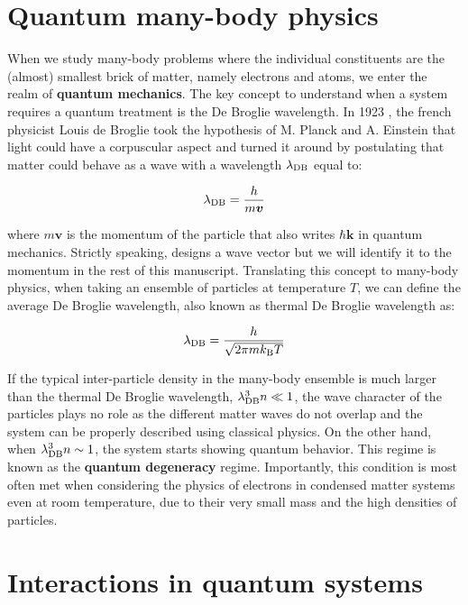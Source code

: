 \section*{Quantum many-body physics}

When we study many-body problems where the individual constituents are the (almost) smallest brick of matter, namely electrons and atoms, we enter the realm of \textbf{quantum mechanics}. The key concept to understand when a system requires a quantum treatment is the De Broglie wavelength. In 1923 \cite{debroglie:tel-00006807}, the french physicist Louis de Broglie took the hypothesis of M. Planck and A. Einstein that light could have a corpuscular aspect and turned it around by postulating that matter could behave as a wave with a wavelength $\lambda_{\rm{DB}}$ equal to:

\begin{equation}
    \lambda_{\rm{DB}} = \frac{h}{m\bm{v}}
\end{equation}

\noindent where $m\bm{v}$ is the momentum of the particle that also writes $\hbar \bm{k}$ in quantum mechanics. Strictly speaking,  designs a wave vector but we will identify it to the momentum in the rest of this manuscript. Translating this concept to many-body physics, when taking an ensemble of particles at temperature $T$, we can define the average De Broglie wavelength, also known as thermal De Broglie wavelength as:

\begin{equation}
    \lambda_{\rm{DB}} = \frac{h}{\sqrt{2 \pi m k_{\mathrm{B}} T}}
\end{equation}

\noindent If the typical inter-particle density in the many-body ensemble is much larger than the thermal De Broglie wavelength, \ie $\lambda_{\rm{DB}}^3 n \ll 1$, the wave character of the particles plays no role as the different matter waves do not overlap and the system can be properly described using classical physics. On the other hand, when $\lambda_{\rm{DB}}^3 n \sim 1$, the system starts showing quantum behavior. This regime is known as the \textbf{quantum degeneracy} regime. Importantly, this condition is most often met when considering the physics of electrons in condensed matter systems even at room temperature, due to their very small mass and the high densities of particles.

\section*{Interactions in quantum systems}


